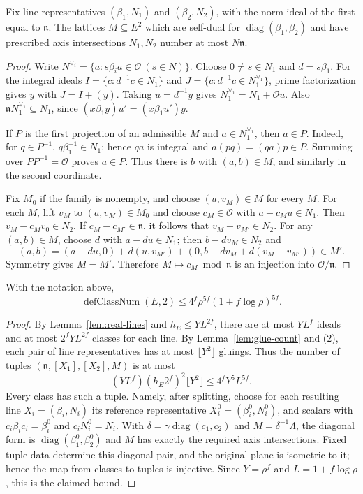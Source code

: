 \begin{lemma}\label{lem:glue-count}
Fix line representatives $(\beta_1,N_1)$ and $(\beta_2,N_2)$, with the norm
ideal of the first equal to $\mathfrak n$. The lattices $M\subseteq E^2$ which
are self-dual for $\operatorname{diag}(\beta_1,\beta_2)$ and have prescribed
axis intersections $N_1,N_2$ number at most $N\mathfrak n$.
\end{lemma}
\begin{proof}
Write $N^{\vee_i}=\{a:\bar s\beta_i a\in\mathcal O\ (s\in N)\}$. Choose
$0\neq s\in N_1$ and $d=\bar s\beta_1$. For the integral ideals
$I=\{c:d^{-1}c\in N_1\}$ and $J=\{c:d^{-1}c\in N_1^{\vee_1}\}$,
prime factorization gives $y$ with $J=I+(y)$. Taking $u=d^{-1}y$ gives
$N_1^{\vee_1}=N_1+\mathcal O u$. Also
$\mathfrak nN_1^{\vee_1}\subseteq N_1$, since
$(\bar x\beta_1y)u'=(\bar x\beta_1u')y$.

If $P$ is the first projection of an admissible $M$ and
$a\in N_1^{\vee_1}$, then $a\in P$. Indeed, for $q\in P^{-1}$,
$\bar q\beta_1^{-1}\in N_1$; hence $qa$ is integral and
$a(pq)=(qa)p\in P$. Summing over $PP^{-1}=\mathcal O$ proves $a\in P$.
Thus there is $b$ with $(a,b)\in M$, and similarly in the second coordinate.

Fix $M_0$ if the family is nonempty, and choose $(u,v_M)\in M$ for every $M$.
For each $M$, lift $v_M$ to $(a,v_M)\in M_0$ and choose $c_M\in\mathcal O$
with $a-c_Mu\in N_1$. Then $v_M-c_Mv_0\in N_2$. If
$c_M-c_{M'}\in\mathfrak n$, it follows that $v_M-v_{M'}\in N_2$. For any
$(a,b)\in M$, choose $d$ with $a-du\in N_1$; then $b-dv_M\in N_2$ and
\[
(a,b)=(a-du,0)+d(u,v_{M'})
 +(0,b-dv_M+d(v_M-v_{M'}))\in M'.
\]
Symmetry gives $M=M'$. Therefore $M\mapsto c_M\bmod\mathfrak n$ is an
injection into $\mathcal O/\mathfrak n$.
\end{proof}

\begin{theorem}\label{thm:rank-two-class-bound}
With the notation above,
\[
\operatorname{defClassNum}(E,2)\leq4^f\rho^{5f}(1+f\log\rho)^{5f}.
\]
\end{theorem}
\begin{proof}
By Lemma~\ref{lem:real-lines} and $h_E\leq YL^{2f}$, there are at most $YL^f$
ideals and at most $2^fYL^{2f}$ classes for each line. By
Lemma~\ref{lem:glue-count} and (2), each pair of line representatives has at
most $\lfloor Y^2\rfloor$ gluings. Thus the number of tuples
$(\mathfrak n,[X_1],[X_2],M)$ is at most
\[
(YL^f)(h_E2^f)^2\lfloor Y^2\rfloor
\leq4^fY^5L^{5f}.
\]
Every class has such a tuple. Namely, after splitting, choose for each
resulting line $X_i=(\beta_i,N_i)$ its reference representative
$X_i^0=(\beta_i^0,N_i^0)$, and scalars with
$\bar c_i\beta_i c_i=\beta_i^0$ and $c_iN_i^0=N_i$.
With $\delta=\gamma\operatorname{diag}(c_1,c_2)$ and $M=\delta^{-1}\Lambda$,
the diagonal form is $\operatorname{diag}(\beta_1^0,\beta_2^0)$ and $M$ has
exactly the required axis intersections. Fixed tuple data determine this
diagonal pair, and the original plane is isometric to it; hence the map from
classes to tuples is injective. Since $Y=\rho^f$ and $L=1+f\log\rho$, this is
the claimed bound.
\end{proof}

